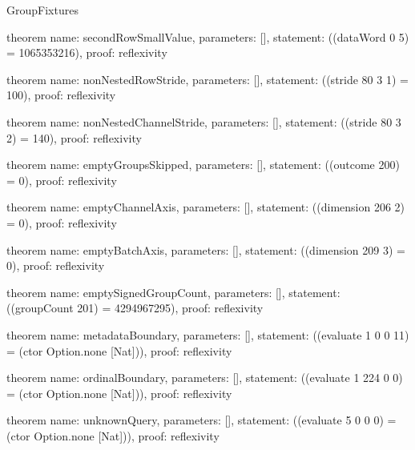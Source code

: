 \begin{lexlean}{GroupFixtures}
\begin{semanticmodule}
theorem{
  name: secondRowSmallValue,
  parameters: [],
  statement: ((dataWord 0 5) = 1065353216),
  proof: reflexivity{}
}

theorem{
  name: nonNestedRowStride,
  parameters: [],
  statement: ((stride 80 3 1) = 100),
  proof: reflexivity{}
}

theorem{
  name: nonNestedChannelStride,
  parameters: [],
  statement: ((stride 80 3 2) = 140),
  proof: reflexivity{}
}

theorem{
  name: emptyGroupsSkipped,
  parameters: [],
  statement: ((outcome 200) = 0),
  proof: reflexivity{}
}

theorem{
  name: emptyChannelAxis,
  parameters: [],
  statement: ((dimension 206 2) = 0),
  proof: reflexivity{}
}

theorem{
  name: emptyBatchAxis,
  parameters: [],
  statement: ((dimension 209 3) = 0),
  proof: reflexivity{}
}

theorem{
  name: emptySignedGroupCount,
  parameters: [],
  statement: ((groupCount 201) = 4294967295),
  proof: reflexivity{}
}

theorem{
  name: metadataBoundary,
  parameters: [],
  statement: ((evaluate 1 0 0 11) = (ctor Option.none [Nat])),
  proof: reflexivity{}
}

theorem{
  name: ordinalBoundary,
  parameters: [],
  statement: ((evaluate 1 224 0 0) = (ctor Option.none [Nat])),
  proof: reflexivity{}
}

theorem{
  name: unknownQuery,
  parameters: [],
  statement: ((evaluate 5 0 0 0) = (ctor Option.none [Nat])),
  proof: reflexivity{}
}
\end{semanticmodule}
\end{lexlean}
